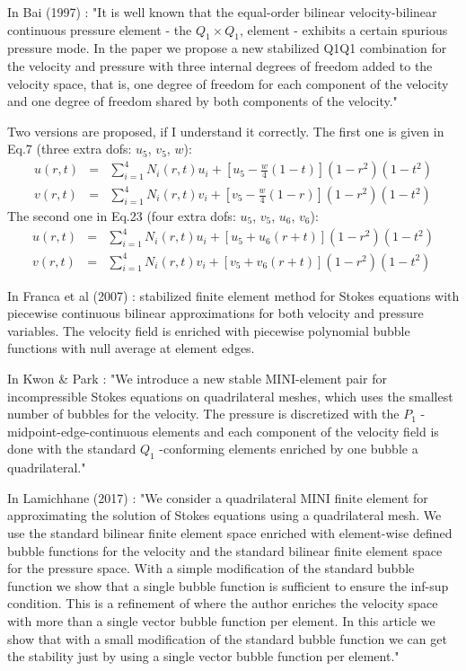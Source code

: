 In Bai (1997) \cite{bai97}: "It is well known that the equal-order bilinear velocity-bilinear 
continuous pressure element - the $Q_1\times Q_1$, element - exhibits a certain spurious pressure mode.
In the paper we propose a new stabilized Q1Q1 combination for the velocity and
pressure with three internal degrees of freedom added to the velocity space, that is, one degree of
freedom for each component of the velocity and one degree of freedom shared by both components of
the velocity."

Two versions are proposed, if I understand it correctly.
The first one is given in Eq.7 (three extra dofs: $u_5$, $v_5$, $w$):
\begin{eqnarray}
u(r,t) &=& \sum_{i=1}^4 N_i (r,t) u_i + \left[ u_5 - \frac{w}{4}(1-t) \right] (1-r^2)(1-t^2) \nonumber\\
v(r,t) &=& \sum_{i=1}^4 N_i (r,t) v_i + \left[ v_5 - \frac{w}{4}(1-r) \right] (1-r^2)(1-t^2) 
\end{eqnarray}
The second one in Eq.23 (four extra dofs: $u_5$, $v_5$, $u_6$, $v_6$):
\begin{eqnarray}
u(r,t) &=& \sum_{i=1}^4 N_i (r,t) u_i + \left[ u_5 +u_6(r+t) \right] (1-r^2)(1-t^2) \nonumber\\
v(r,t) &=& \sum_{i=1}^4 N_i (r,t) v_i + \left[ v_5 +v_6(r+t) \right] (1-r^2)(1-t^2) 
\end{eqnarray}

In Franca et al (2007) \cite{fros07}: 
stabilized finite element method for Stokes equations with piecewise continuous 
bilinear approximations for both velocity and pressure variables. The velocity
field is enriched with piecewise polynomial bubble functions with null average at element
edges.

In Kwon \& Park \cite{kwpa14}: 
"We introduce a new stable MINI-element pair for incompressible Stokes equations on
quadrilateral meshes, which uses the smallest number of bubbles for the velocity. The pressure is 
discretized with the $P_1$ -midpoint-edge-continuous elements and each component of the velocity field is
done with the standard $Q_1$ -conforming elements enriched by one bubble a quadrilateral."


In Lamichhane (2017) \cite{lami17}: "We consider a quadrilateral MINI
finite element for approximating the solution
of Stokes equations using a quadrilateral mesh. We use the standard bilinear finite
element space enriched with element-wise defined bubble functions for the velocity
and the standard bilinear finite element space for the pressure space. With a simple
modification of the standard bubble function we show that a single bubble function is
sufficient to ensure the inf-sup condition.
This is a refinement of \cite{bai97} where the author enriches the velocity space with
more than a single vector bubble function per element. In this article we show that with a small modification of the standard bubble function we can get the stability just by using a single vector bubble function per element."

